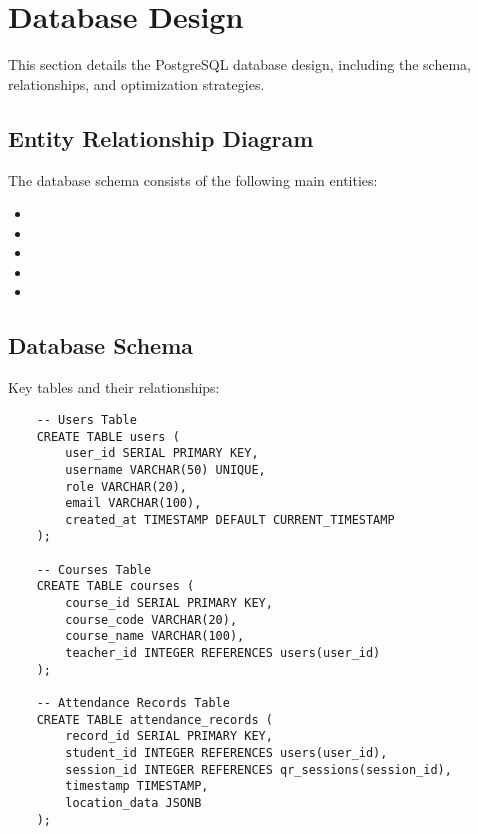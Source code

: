 \section{Database Design}
\begin{infobox}
This section details the PostgreSQL database design, including the schema, relationships, and optimization strategies.
\end{infobox}

\subsection{Entity Relationship Diagram}
\textcolor{TextBlack}{
    The database schema consists of the following main entities:
    \begin{itemize}
        \item {}
        \item {}
        \item {}
        \item {}
        \item {}
    \end{itemize}
}

\subsection{Database Schema}
\begin{notebox}
\textcolor{TextBlack}{
    Key tables and their relationships:

    \begin{verbatim}
    -- Users Table
    CREATE TABLE users (
        user_id SERIAL PRIMARY KEY,
        username VARCHAR(50) UNIQUE,
        role VARCHAR(20),
        email VARCHAR(100),
        created_at TIMESTAMP DEFAULT CURRENT_TIMESTAMP
    );

    -- Courses Table
    CREATE TABLE courses (
        course_id SERIAL PRIMARY KEY,
        course_code VARCHAR(20),
        course_name VARCHAR(100),
        teacher_id INTEGER REFERENCES users(user_id)
    );

    -- Attendance Records Table
    CREATE TABLE attendance_records (
        record_id SERIAL PRIMARY KEY,
        student_id INTEGER REFERENCES users(user_id),
        session_id INTEGER REFERENCES qr_sessions(session_id),
        timestamp TIMESTAMP,
        location_data JSONB
    );
    \end{verbatim}
}
\end{notebox}


